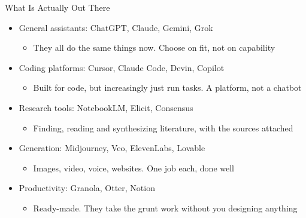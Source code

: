 \documentclass[aspectratio=169]{beamer}
\begin{document}
\begin{frame}{What Is Actually Out There}
    \begin{itemize}\setlength{\itemsep}{4pt}
        \item General assistants: ChatGPT, Claude, Gemini, Grok
        \vspace{2pt}\begin{itemize}\item They all do the same things now. Choose on fit, not on capability\end{itemize}
        \item Coding platforms: Cursor, Claude Code, Devin, Copilot
        \vspace{2pt}\begin{itemize}\item Built for code, but increasingly just run tasks. A platform, not a chatbot\end{itemize}
        \item Research tools: NotebookLM, Elicit, Consensus
        \vspace{2pt}\begin{itemize}\item Finding, reading and synthesizing literature, with the sources attached\end{itemize}
        \item Generation: Midjourney, Veo, ElevenLabs, Lovable
        \vspace{2pt}\begin{itemize}\item Images, video, voice, websites. One job each, done well\end{itemize}
        \item Productivity: Granola, Otter, Notion
        \vspace{2pt}\begin{itemize}\item Ready-made. They take the grunt work without you designing anything\end{itemize}
    \end{itemize}
\end{frame}
\end{document}
